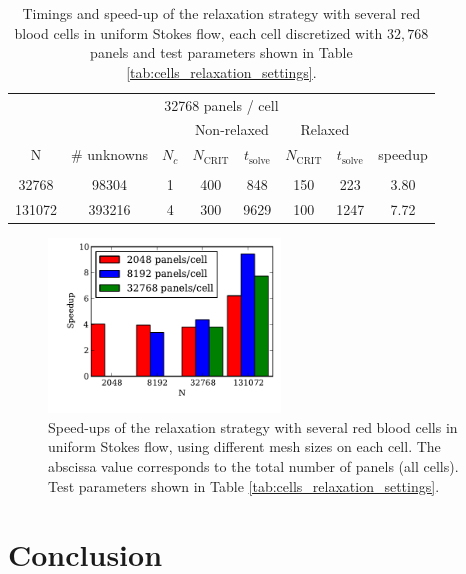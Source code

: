 \documentclass[final,leqno,]{siamltex1213}
\newcommand{\ncrit}{N_{\text{CRIT}}}
\newcommand{\tsolve}{t_{\text{solve}}}
\begin{document}
\begin{table}[htdp]
\footnotesize
\begin{center}
\begin{tabular}{c|c|c|cc|cc|c}
\multicolumn{8}{c}{32768 panels / cell} \\
& & & \multicolumn{2}{c}{Non-relaxed} & \multicolumn{2}{c}{Relaxed}\\
N & \# unknowns & $N_c$ & $\ncrit$ & $\tsolve$ & $\ncrit$ & $\tsolve$ & speedup \\ \hline
& & & & & & &  \\
32768 & 98304 & 1 & 400 & 848 & 150 & 223 & 3.80 \\
131072 & 393216 & 4 & 300 & 9629\footnotemark[1] & 100 & 1247 & 7.72\footnotemark[1] \\	
\end{tabular}
\end{center}
\caption{Timings and speed-up of the relaxation strategy with several red blood cells in uniform Stokes flow, each cell discretized with $32,768$ panels and test parameters shown in Table \ref{tab:cells_relaxation_settings}.}
\label{tab:multiple_cell_relaxation_results_32768}
\end{table}


\begin{figure}[h]
\begin{center}
	\includegraphics[natwidth=4in,natheight=3in,width=0.55\textwidth]{EthrocyteMultipleCellSpeedup.pdf}
	\caption{Speed-ups of the relaxation strategy with several red blood cells in uniform Stokes flow, using different mesh sizes on each cell. The abscissa value corresponds to the total number of panels (all cells). Test parameters shown in Table \ref{tab:cells_relaxation_settings}.}
	\label{fig:multiple_cell_speedup}
\end{center}
\end{figure}


\section{Conclusion} 
\end{document}
